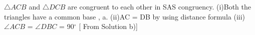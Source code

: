 $\triangle ACB$ and $\triangle DCB$ are congruent to each other in SAS congruency.
(i)Both the triangles have a common base , a.
\newline
(ii)AC = DB by using distance formula
\newline
(iii)$\angle ACB$ = $\angle DBC$ = 90$^{\circ}$ [ From Solution b)]
